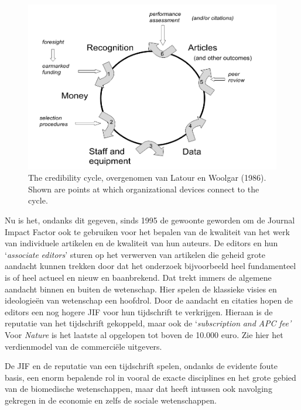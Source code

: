 \documentclass[smallauthor, chapterhaspagenum, nochapterinheader, pagenuminheader,  bigchapnum,medium2, tocpages, garamond, titleinheader]{jote-book}
\begin{document}
	\begin{figure}
		\includegraphics[width=\linewidth]{media/image2.png}



		\label{fig:rId16}



		\caption{The credibility cycle, overgenomen van Latour en Woolgar (1986). Shown are points at which organizational devices connect to the cycle.}
	\end{figure}



	Nu is het, ondanks dit gegeven, sinds 1995 de gewoonte geworden om de Journal Impact Factor ook te gebruiken voor het bepalen van de kwaliteit van het werk van individuele artikelen en de kwaliteit van hun auteurs. De editors en hun ‘\emph{associate}\emph{ editors}' sturen op het verwerven van artikelen die geheid grote aandacht kunnen trekken door dat het onderzoek bijvoorbeeld heel fundamenteel is of heel actueel en nieuw en baanbrekend. Dat trekt immers de algemene aandacht binnen en buiten de wetenschap. Hier spelen de klassieke visies en ideologieën van wetenschap een hoofdrol. Door de aandacht en citaties hopen de editors een nog hogere JIF voor hun tijdschrift te verkrijgen. Hieraan is de reputatie van het tijdschrift gekoppeld, maar ook de ‘\emph{subscription}\emph{ }\emph{and}\emph{ APC fee'} Voor \emph{Nature} is het laatste al opgelopen tot boven de 10.000 euro. Zie hier het verdienmodel van de commerciële uitgevers.



	De JIF en de reputatie van een tijdschrift spelen, ondanks de evidente foute basis, een enorm bepalende rol in vooral de exacte disciplines en het grote gebied van de biomedische wetenschappen, maar dat heeft intussen ook navolging gekregen in de economie en zelfs de sociale wetenschappen.
\end{document}
